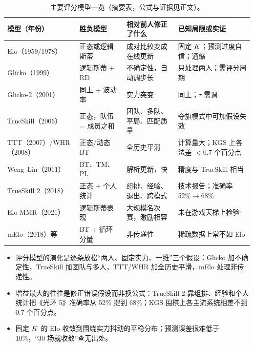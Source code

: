 \begin{table}[tbp]
  \centering\footnotesize
  \caption{主要评分模型一览（摘要表，公式与证据见正文）。}
  \label{tab:1a-models}
  \begin{tabularx}{\linewidth}{>{\raggedright\arraybackslash}p{2.4cm}>{\raggedright\arraybackslash}p{2.6cm}>{\raggedright\arraybackslash}X>{\raggedright\arraybackslash}X}
    \toprule
    模型（年份） & 胜负模型 & 相对前人修正了什么 & 已知局限或实证 \\
    \midrule
    Elo（1959/1978） & 正态或逻辑斯蒂 & 成对比较变成在线更新 & 固定 $K$；预测过度自信；通缩 \\
    Glicko（1999） & 逻辑斯蒂 + RD & 不确定性，自动调步长 & 只处理两人；需评分周期 \\
    Glicko-2（2001） & 同上 + 波动率 & 实力突变 & 同上；$\tau$ 需调 \\
    TrueSkill（2006） & 正态，队伍 = 成员之和 & 团队、多队、平局、匹配质量 & 夺旗模式中可加假设失效 \\
    TTT（2007）/WHR（2008） & 正态/动态 BT & 全历史平滑 & 计算量大；KGS 上各法差 $<0.7$ 个百分点 \\
    Weng–Lin（2011） & BT、TM、PL & 解析更新，快 & 精度与 TrueSkill 相当 \\
    TrueSkill 2（2018） & 正态 + 个人统计 & 组排、经验、退出、跨模式 & 技术报告；准确率 52\%$\to$68\% \\
    Elo-MMR（2021） & 逻辑斯蒂表现 & 大规模名次赛，激励相容 & 未在游戏天梯上检验 \\
    mElo（2018）等 & BT + 循环分量 & 非传递性 & 稀疏数据上常不如 Elo \\
    \bottomrule
  \end{tabularx}
\end{table}

\begin{keybox}
\begin{itemize}
  \item 评分模型的演化是逐条放松“两人、固定实力、一维”三个假设：Glicko 加不确定性，TrueSkill 加团队与多人，TTT/WHR 加全历史平滑，mElo 处理非传递性。
  \item 增益最大的往往是修正错误假设而非换公式：TrueSkill 2 靠组排、经验和个人统计把《光环 5》准确率从 52\% 提到 68\%；KGS 围棋上各主流系统相差不到 0.7 个百分点。
  \item 固定 $K$ 的 Elo 收敛到围绕实力抖动的平稳分布；预测误差很难低于 10\%，“30 场就收敛”查无出处。
\end{itemize}
\end{keybox}

